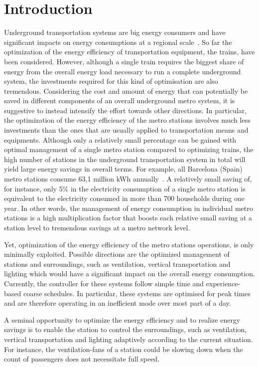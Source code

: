 \section{Introduction}
\label{sec:introduction}
Underground transportation systems are big energy consumers and have significant impacts on energy consumptions at a regional scale~\cite{anderson_maximizing_2009}. 
So far the optimization of the energy efficiency of transportation equipment, the trains, have been considered. 
However, although a single train requires the biggest share of energy from the overall energy load necessary to run a complete underground system, the investments required for this kind of optimisation are also tremendous. 
Considering the cost and amount of energy that can potentially be saved in different components of an overall underground metro system, it is suggestive to instead intensify the effort towards other directions.   
In particular, the optimization of the energy efficiency of the metro stations involves much less investments than the ones that are usually applied to transportation means and equipments. 
Although only a relatively small percentage can be gained with optimal management of a single metro station compared to optimizing trains, the high number of stations in the underground transportation system in total will yield large energy savings in overall terms. 
For example, all Barcelona (Spain) metro stations consume 63,1 million kWh annually~\cite{TMB}. 
A relatively small saving of, for instance, only 5\% in the electricity consumption of a single metro station is equivalent to the electricity consumed in more than 700 households during one year.
In other words, the management of energy consumption in individual metro stations is a high multiplication factor that boosts each relative small saving at a station level to tremendous savings at a metro network level.

Yet, optimization of the energy efficiency of the metro stations operations, is only minimally exploited.
Possible directions are the optimized management of stations and surroundings, such as ventilation, vertical transportation and lighting which would have a significant impact on the overall energy consumption.
Currently, the controller for these systems follow simple time and experience-based coarse schedules. 
In particular, these systems are optimised for peak times and are therefore operating in an inefficient mode over most part of a day.

A seminal opportunity to optimize the energy efficiency and to realize energy savings is to enable the station to control the surroundings, such as ventilation, vertical transportation and lighting adaptively according to the current situation. 
For instance, the ventilation-fans of a station could be slowing down when the count of passengers does not necessitate full speed.


